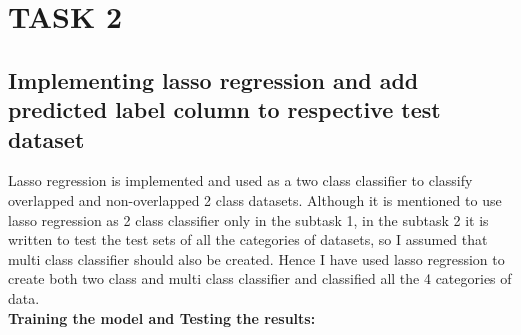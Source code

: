 \documentclass[conference]{IEEEtran}
\begin{document}
\section{TASK 2 }
\subsection{Implementing lasso regression and add predicted label column to respective test dataset}
Lasso regression is implemented and used as a two class classifier to classify overlapped and non-overlapped 2 class datasets. Although it is mentioned to use lasso regression as 2 class classifier only in the subtask 1, in the subtask 2 it is written to test the test sets of all the categories of datasets, so I assumed that multi class classifier should also be created. Hence I have used lasso regression to create both two class and multi class classifier and classified all the 4 categories of data. \\
\textbf{Training the model and Testing the results:}\\
\end{document}
